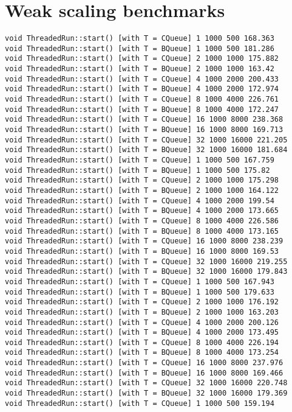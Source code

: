 \section{Weak scaling benchmarks}
\small
\begin{verbatim}
void ThreadedRun::start() [with T = CQueue] 1 1000 500 168.363
void ThreadedRun::start() [with T = BQueue] 1 1000 500 181.286
void ThreadedRun::start() [with T = CQueue] 2 1000 1000 175.882
void ThreadedRun::start() [with T = BQueue] 2 1000 1000 163.42
void ThreadedRun::start() [with T = CQueue] 4 1000 2000 200.433
void ThreadedRun::start() [with T = BQueue] 4 1000 2000 172.974
void ThreadedRun::start() [with T = CQueue] 8 1000 4000 226.761
void ThreadedRun::start() [with T = BQueue] 8 1000 4000 172.247
void ThreadedRun::start() [with T = CQueue] 16 1000 8000 238.368
void ThreadedRun::start() [with T = BQueue] 16 1000 8000 169.713
void ThreadedRun::start() [with T = CQueue] 32 1000 16000 221.205
void ThreadedRun::start() [with T = BQueue] 32 1000 16000 181.684
void ThreadedRun::start() [with T = CQueue] 1 1000 500 167.759
void ThreadedRun::start() [with T = BQueue] 1 1000 500 175.82
void ThreadedRun::start() [with T = CQueue] 2 1000 1000 175.298
void ThreadedRun::start() [with T = BQueue] 2 1000 1000 164.122
void ThreadedRun::start() [with T = CQueue] 4 1000 2000 199.54
void ThreadedRun::start() [with T = BQueue] 4 1000 2000 173.665
void ThreadedRun::start() [with T = CQueue] 8 1000 4000 226.586
void ThreadedRun::start() [with T = BQueue] 8 1000 4000 173.165
void ThreadedRun::start() [with T = CQueue] 16 1000 8000 238.239
void ThreadedRun::start() [with T = BQueue] 16 1000 8000 169.53
void ThreadedRun::start() [with T = CQueue] 32 1000 16000 219.255
void ThreadedRun::start() [with T = BQueue] 32 1000 16000 179.843
void ThreadedRun::start() [with T = CQueue] 1 1000 500 167.943
void ThreadedRun::start() [with T = BQueue] 1 1000 500 179.633
void ThreadedRun::start() [with T = CQueue] 2 1000 1000 176.192
void ThreadedRun::start() [with T = BQueue] 2 1000 1000 163.203
void ThreadedRun::start() [with T = CQueue] 4 1000 2000 200.126
void ThreadedRun::start() [with T = BQueue] 4 1000 2000 173.495
void ThreadedRun::start() [with T = CQueue] 8 1000 4000 226.194
void ThreadedRun::start() [with T = BQueue] 8 1000 4000 173.254
void ThreadedRun::start() [with T = CQueue] 16 1000 8000 237.976
void ThreadedRun::start() [with T = BQueue] 16 1000 8000 169.466
void ThreadedRun::start() [with T = CQueue] 32 1000 16000 220.748
void ThreadedRun::start() [with T = BQueue] 32 1000 16000 179.369
void ThreadedRun::start() [with T = CQueue] 1 1000 500 159.194

\end{verbatim}
